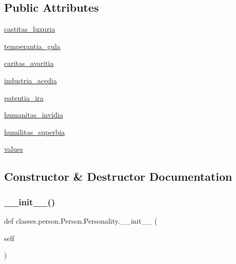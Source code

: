 \subsection*{Public Attributes}
\begin{DoxyCompactItemize}
\item 
\hyperlink{classclasses_1_1person_1_1Person_1_1Personality_a49383135ceabfb9a76d3b60119ed1ed5}{castitas\+\_\+luxuria}
\item 
\hyperlink{classclasses_1_1person_1_1Person_1_1Personality_a6ae2ef97f4041f4cde4c92bf95c22750}{temperantia\+\_\+gula}
\item 
\hyperlink{classclasses_1_1person_1_1Person_1_1Personality_a389b37ff8fcc6c49a7d574d4e95d71e6}{caritas\+\_\+avaritia}
\item 
\hyperlink{classclasses_1_1person_1_1Person_1_1Personality_ab435e58fb305c77297cecef7c5cc1c2f}{industria\+\_\+acedia}
\item 
\hyperlink{classclasses_1_1person_1_1Person_1_1Personality_a5a2395485bb7fd07c2204a266cc68dec}{patentia\+\_\+ira}
\item 
\hyperlink{classclasses_1_1person_1_1Person_1_1Personality_aab544ce6ccc3b8a7e1edb277257a369d}{humanitas\+\_\+invidia}
\item 
\hyperlink{classclasses_1_1person_1_1Person_1_1Personality_a609025e02f7ce01e4c0f075c42d1669e}{humilitas\+\_\+superbia}
\item 
\hyperlink{classclasses_1_1person_1_1Person_1_1Personality_ac04c3cf8dd1e34a6f67889650415a837}{values}
\end{DoxyCompactItemize}


\subsection{Constructor \& Destructor Documentation}
\mbox{\label{classclasses_1_1person_1_1Person_1_1Personality_a034c4404a486c2ae4f13b069c01851a6}} 
\subsubsection{\texorpdfstring{\+\_\+\+\_\+init\+\_\+\+\_\+()}{\_\_init\_\_()}}
{\footnotesize\ttfamily def classes.\+person.\+Person.\+Personality.\+\_\+\+\_\+init\+\_\+\+\_\+ (\begin{DoxyParamCaption}\item[{}]{self }\end{DoxyParamCaption})}



